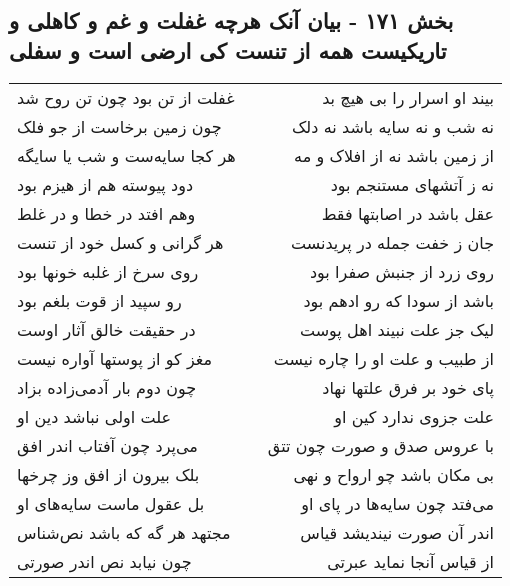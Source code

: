 \begin{center}
\section*{بخش ۱۷۱ - بیان آنک هرچه غفلت و غم و کاهلی و تاریکیست همه از تنست کی ارضی است و سفلی}
\label{sec:sh171}
\begin{longtable}{l p{0.5cm} r}
غفلت از تن بود چون تن روح شد
&&
بیند او اسرار را بی هیچ بد
\\
چون زمین برخاست از جو فلک
&&
نه شب و نه سایه باشد نه دلک
\\
هر کجا سایه‌ست و شب یا سایگه
&&
از زمین باشد نه از افلاک و مه
\\
دود پیوسته هم از هیزم بود
&&
نه ز آتشهای مستنجم بود
\\
وهم افتد در خطا و در غلط
&&
عقل باشد در اصابتها فقط
\\
هر گرانی و کسل خود از تنست
&&
جان ز خفت جمله در پریدنست
\\
روی سرخ از غلبه خونها بود
&&
روی زرد از جنبش صفرا بود
\\
رو سپید از قوت بلغم بود
&&
باشد از سودا که رو ادهم بود
\\
در حقیقت خالق آثار اوست
&&
لیک جز علت نبیند اهل پوست
\\
مغز کو از پوستها آواره نیست
&&
از طبیب و علت او را چاره نیست
\\
چون دوم بار آدمی‌زاده بزاد
&&
پای خود بر فرق علتها نهاد
\\
علت اولی نباشد دین او
&&
علت جزوی ندارد کین او
\\
می‌پرد چون آفتاب اندر افق
&&
با عروس صدق و صورت چون تتق
\\
بلک بیرون از افق وز چرخها
&&
بی مکان باشد چو ارواح و نهی
\\
بل عقول ماست سایه‌های او
&&
می‌فتد چون سایه‌ها در پای او
\\
مجتهد هر گه که باشد نص‌شناس
&&
اندر آن صورت نیندیشد قیاس
\\
چون نیابد نص اندر صورتی
&&
از قیاس آنجا نماید عبرتی
\\
\end{longtable}
\end{center}
